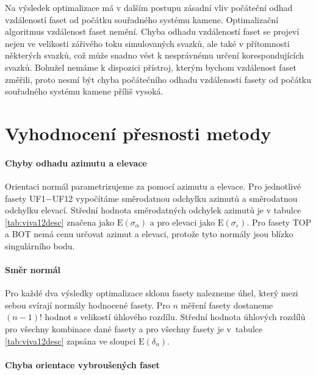 	Na výsledek optimalizace má v dalším postupu zásadní vliv počáteční odhad vzdáleností faset od počátku souřadného systému kamene. Optimalizační algoritmus vzdálenost faset nemění. Chyba odhadu vzdáleností faset se projeví nejen ve velikosti zářivého toku simulovaných svazků, ale také v přítomnosti některých svazků, což může snadno vést k nesprávnému určení korespondujících svazků. Bohužel nemáme k dispozici přístroj, kterým bychom vzdá\-le\-nost faset změřili, proto nesmí být chyba počátečního odhadu vzdálenosti fasety od počátku sou\-řad\-né\-ho systému kamene příliš vysoká. 
	
	
\newpage
\section{Vyhodnocení přesnosti metody}

\paragraph{Chyby odhadu azimutu a elevace}
\hspace{1mm}

	Orientaci normál parametrizujeme za pomocí azimutu a elevace. Pro jednotlivé fasety UF1$-$UF12 vy\-po\-čí\-tá\-me směrodatnou odchylku azimutů a směrodatnou odchylku elevací. Střední hodnota směrodatných odchylek azimutů je v tabulce \ref{tab:viva12desc} značena jako $\mathrm{E}(\sigma_{\alpha})$ a pro elevaci jako $\mathrm{E}(\sigma_{\varepsilon})$. Pro fasety TOP a BOT nemá cenu určovat azimut a elevaci, protože tyto normály jsou blízko singulárního bodu. 

\paragraph{Směr normál}
\hspace{1mm}	

	Pro každé dva výsledky optimalizace sklonu fasety nalezneme úhel, který mezi sebou svírají normály hodnocené fasety. Pro $n$ měření fasety dostaneme $(n-1)!$ hodnot s velikostí úhlového rozdílu. Střední hodnota úhlových rozdílů pro všechny kombinace dané fasety a pro všechny fasety je v~tabulce \ref{tab:viva12desc} zapsána ve sloupci $\mathrm{E}(\delta_n)$. 
	
\paragraph{Chyba orientace vybroušených faset}
\hspace{1mm}	

